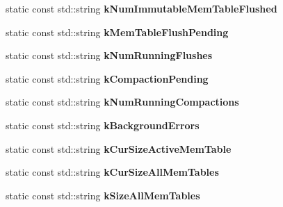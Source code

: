 \begin{DoxyCompactItemize}
\item 
static const std\+::string {\bfseries k\+Num\+Immutable\+Mem\+Table\+Flushed}\hypertarget{structrocksdb_1_1DB_1_1Properties_a8d7e638b5e0d14edf1d17465b777193d}{}\label{structrocksdb_1_1DB_1_1Properties_a8d7e638b5e0d14edf1d17465b777193d}

\item 
static const std\+::string {\bfseries k\+Mem\+Table\+Flush\+Pending}\hypertarget{structrocksdb_1_1DB_1_1Properties_a66d17eb32157ef7d7d49aa1f693badfb}{}\label{structrocksdb_1_1DB_1_1Properties_a66d17eb32157ef7d7d49aa1f693badfb}

\item 
static const std\+::string {\bfseries k\+Num\+Running\+Flushes}\hypertarget{structrocksdb_1_1DB_1_1Properties_a96e8694cefc187caec15225d6943159e}{}\label{structrocksdb_1_1DB_1_1Properties_a96e8694cefc187caec15225d6943159e}

\item 
static const std\+::string {\bfseries k\+Compaction\+Pending}\hypertarget{structrocksdb_1_1DB_1_1Properties_a2c2ccdf5371af903899b10596b4e5a1c}{}\label{structrocksdb_1_1DB_1_1Properties_a2c2ccdf5371af903899b10596b4e5a1c}

\item 
static const std\+::string {\bfseries k\+Num\+Running\+Compactions}\hypertarget{structrocksdb_1_1DB_1_1Properties_a3286565eff8439c54b849e603c85fc48}{}\label{structrocksdb_1_1DB_1_1Properties_a3286565eff8439c54b849e603c85fc48}

\item 
static const std\+::string {\bfseries k\+Background\+Errors}\hypertarget{structrocksdb_1_1DB_1_1Properties_af8c84eb10690dd07bbf2e907e11be309}{}\label{structrocksdb_1_1DB_1_1Properties_af8c84eb10690dd07bbf2e907e11be309}

\item 
static const std\+::string {\bfseries k\+Cur\+Size\+Active\+Mem\+Table}\hypertarget{structrocksdb_1_1DB_1_1Properties_a51acf2eefa22032a0a26e8bfcbf3b8fe}{}\label{structrocksdb_1_1DB_1_1Properties_a51acf2eefa22032a0a26e8bfcbf3b8fe}

\item 
static const std\+::string {\bfseries k\+Cur\+Size\+All\+Mem\+Tables}\hypertarget{structrocksdb_1_1DB_1_1Properties_a9a94abbbf98153f8487ec27c9086e1ec}{}\label{structrocksdb_1_1DB_1_1Properties_a9a94abbbf98153f8487ec27c9086e1ec}

\item 
static const std\+::string {\bfseries k\+Size\+All\+Mem\+Tables}\hypertarget{structrocksdb_1_1DB_1_1Properties_a57adbc2205e318f7b1d9f351d896cf1b}{}\label{structrocksdb_1_1DB_1_1Properties_a57adbc2205e318f7b1d9f351d896cf1b}


\end{DoxyCompactItemize}
